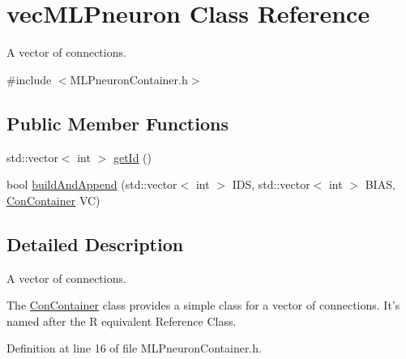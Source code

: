 \hypertarget{classvec_m_l_pneuron}{
\section{vecMLPneuron Class Reference}
\label{classvec_m_l_pneuron}
}


A vector of connections.  




{\ttfamily \#include $<$MLPneuronContainer.h$>$}

\subsection*{Public Member Functions}
\begin{DoxyCompactItemize}
\item 
std::vector$<$ int $>$ \hyperlink{classvec_m_l_pneuron_a6ca2656e3ef5998104dd08b80597c7b8}{getId} ()
\item 
bool \hyperlink{classvec_m_l_pneuron_a03f54489ffe29606bd279fa6282c31a7}{buildAndAppend} (std::vector$<$ int $>$ IDS, std::vector$<$ int $>$ BIAS, \hyperlink{class_con_container}{ConContainer} VC)
\end{DoxyCompactItemize}


\subsection{Detailed Description}
A vector of connections. 

The \hyperlink{class_con_container}{ConContainer} class provides a simple class for a vector of connections. It's named after the R equivalent Reference Class. 

Definition at line 16 of file MLPneuronContainer.h.




